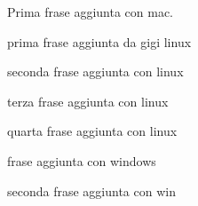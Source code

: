\documentclass[a4paper]{article}
\begin{document}
Prima frase aggiunta con mac.

prima frase aggiunta da gigi linux

seconda frase aggiunta con linux

terza frase aggiunta con linux

quarta frase aggiunta con linux

frase aggiunta con windows

seconda frase aggiunta con win
\end{document}
